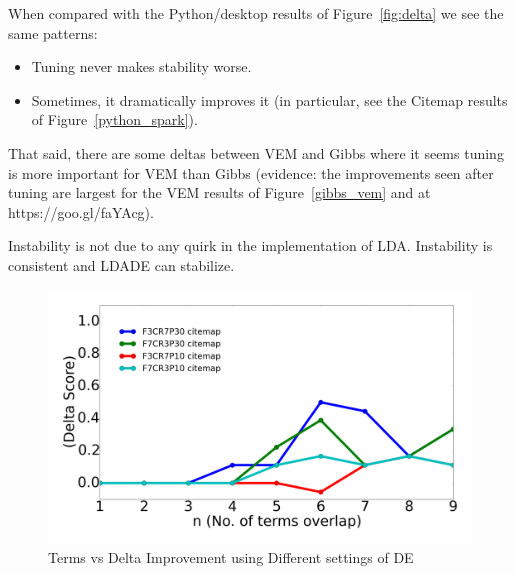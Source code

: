 \documentclass[twocolumn,5p,sort&compress]{elsarticle}
\newcommand{\bi}{\begin{itemize}}
\newcommand{\ei}{\end{itemize}}
\theoremstyle{break}
\begin{document}
   When compared with the Python/desktop results of
   Figure~\ref{fig:delta} we see the same patterns:
   \bi
 \item Tuning never makes stability worse.
 \item Sometimes, it dramatically improves it (in particular, see the Citemap results
   of  Figure~\ref{python_spark}).
   \ei
   That said, there are some deltas between VEM and Gibbs where it seems tuning
   is more important for VEM than Gibbs (evidence: the improvements seen after
   tuning are largest for the  VEM results of  Figure~\ref{gibbs_vem} and at  https://goo.gl/faYAcg).

\begin{lesson}
  Instability is not due to any quirk in the implementation of LDA. Instability is consistent and LDADE can stabilize. 
\end{lesson}

\begin{figure}[!b]
  \includegraphics[width=\linewidth]{./fig/citemap.png}
  \caption{Terms vs Delta Improvement using Different settings of DE}
  \label{fig:RQ4}
\end{figure}
\end{document}
